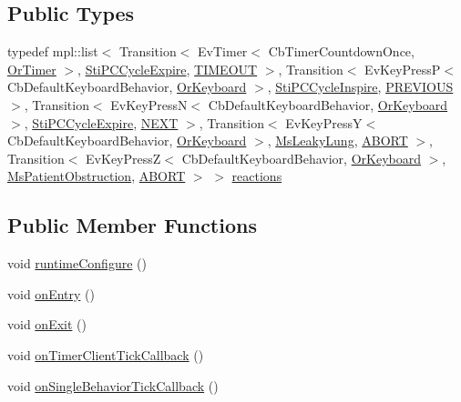 \subsection*{Public Types}
\begin{DoxyCompactItemize}
\item 
typedef mpl\+::list$<$ Transition$<$ Ev\+Timer$<$ Cb\+Timer\+Countdown\+Once, \hyperlink{classsm__respira__1_1_1OrTimer}{Or\+Timer} $>$, \hyperlink{structsm__respira__1_1_1pc__cycle__inner__states_1_1StiPCCycleExpire}{Sti\+P\+C\+Cycle\+Expire}, \hyperlink{structsm__respira__1_1_1pc__cycle__inner__states_1_1StiPCCyclePlateau_1_1TIMEOUT}{T\+I\+M\+E\+O\+UT} $>$, Transition$<$ Ev\+Key\+PressP$<$ Cb\+Default\+Keyboard\+Behavior, \hyperlink{classsm__respira__1_1_1OrKeyboard}{Or\+Keyboard} $>$, \hyperlink{structsm__respira__1_1_1pc__cycle__inner__states_1_1StiPCCycleInspire}{Sti\+P\+C\+Cycle\+Inspire}, \hyperlink{structsm__respira__1_1_1pc__cycle__inner__states_1_1StiPCCyclePlateau_1_1PREVIOUS}{P\+R\+E\+V\+I\+O\+US} $>$, Transition$<$ Ev\+Key\+PressN$<$ Cb\+Default\+Keyboard\+Behavior, \hyperlink{classsm__respira__1_1_1OrKeyboard}{Or\+Keyboard} $>$, \hyperlink{structsm__respira__1_1_1pc__cycle__inner__states_1_1StiPCCycleExpire}{Sti\+P\+C\+Cycle\+Expire}, \hyperlink{structsm__respira__1_1_1pc__cycle__inner__states_1_1StiPCCyclePlateau_1_1NEXT}{N\+E\+XT} $>$, Transition$<$ Ev\+Key\+PressY$<$ Cb\+Default\+Keyboard\+Behavior, \hyperlink{classsm__respira__1_1_1OrKeyboard}{Or\+Keyboard} $>$, \hyperlink{classsm__respira__1_1_1MsLeakyLung}{Ms\+Leaky\+Lung}, \hyperlink{classABORT}{A\+B\+O\+RT} $>$, Transition$<$ Ev\+Key\+PressZ$<$ Cb\+Default\+Keyboard\+Behavior, \hyperlink{classsm__respira__1_1_1OrKeyboard}{Or\+Keyboard} $>$, \hyperlink{classsm__respira__1_1_1MsPatientObstruction}{Ms\+Patient\+Obstruction}, \hyperlink{classABORT}{A\+B\+O\+RT} $>$ $>$ \hyperlink{structsm__respira__1_1_1pc__cycle__inner__states_1_1StiPCCyclePlateau_a0c51f165d5ab7bc19d821cb2d9b7154d}{reactions}
\end{DoxyCompactItemize}
\subsection*{Public Member Functions}
\begin{DoxyCompactItemize}
\item 
void \hyperlink{structsm__respira__1_1_1pc__cycle__inner__states_1_1StiPCCyclePlateau_a3805f3ea12735bcb40af9c9db7e5ce05}{runtime\+Configure} ()
\item 
void \hyperlink{structsm__respira__1_1_1pc__cycle__inner__states_1_1StiPCCyclePlateau_ad86b1d986fb646c126b7c35473471184}{on\+Entry} ()
\item 
void \hyperlink{structsm__respira__1_1_1pc__cycle__inner__states_1_1StiPCCyclePlateau_a054d56f611c92414b9a7e58653935edf}{on\+Exit} ()
\item 
void \hyperlink{structsm__respira__1_1_1pc__cycle__inner__states_1_1StiPCCyclePlateau_ac06330f07324f60ea5870ac89c75f7c5}{on\+Timer\+Client\+Tick\+Callback} ()
\item 
void \hyperlink{structsm__respira__1_1_1pc__cycle__inner__states_1_1StiPCCyclePlateau_ac60bee4ecb4dd1983446b091075ce0b3}{on\+Single\+Behavior\+Tick\+Callback} ()
\end{DoxyCompactItemize}

